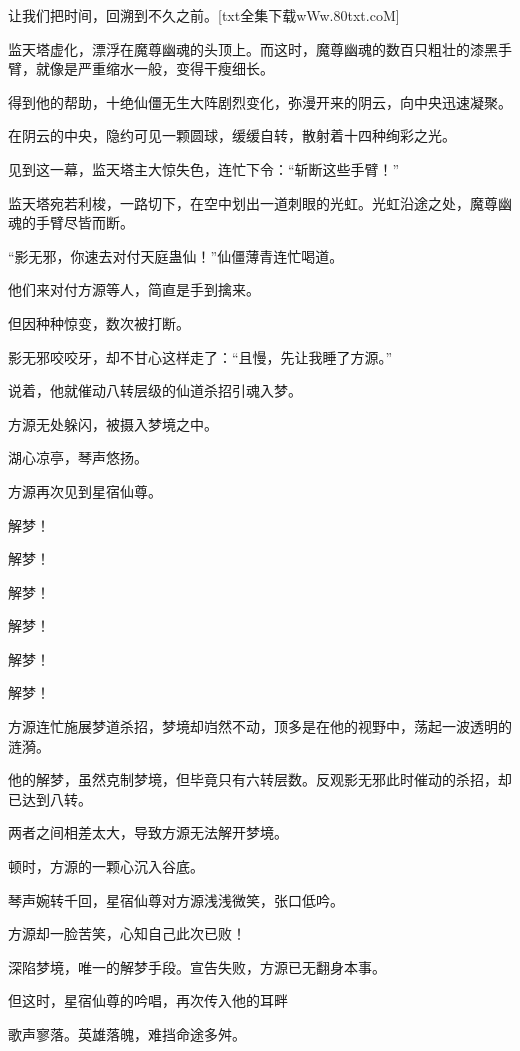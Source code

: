 
\begin{this_body}

让我们把时间，回溯到不久之前。[txt全集下载wWw.80txt.coM]

监天塔虚化，漂浮在魔尊幽魂的头顶上。而这时，魔尊幽魂的数百只粗壮的漆黑手臂，就像是严重缩水一般，变得干瘦细长。

得到他的帮助，十绝仙僵无生大阵剧烈变化，弥漫开来的阴云，向中央迅速凝聚。

在阴云的中央，隐约可见一颗圆球，缓缓自转，散射着十四种绚彩之光。

见到这一幕，监天塔主大惊失色，连忙下令：“斩断这些手臂！”

监天塔宛若利梭，一路切下，在空中划出一道刺眼的光虹。光虹沿途之处，魔尊幽魂的手臂尽皆而断。

“影无邪，你速去对付天庭蛊仙！”仙僵薄青连忙喝道。

他们来对付方源等人，简直是手到擒来。

但因种种惊变，数次被打断。

影无邪咬咬牙，却不甘心这样走了：“且慢，先让我睡了方源。”

说着，他就催动八转层级的仙道杀招引魂入梦。

方源无处躲闪，被摄入梦境之中。

湖心凉亭，琴声悠扬。

方源再次见到星宿仙尊。

解梦！

解梦！

解梦！

解梦！

解梦！

解梦！

方源连忙施展梦道杀招，梦境却岿然不动，顶多是在他的视野中，荡起一波透明的涟漪。

他的解梦，虽然克制梦境，但毕竟只有六转层数。反观影无邪此时催动的杀招，却已达到八转。

两者之间相差太大，导致方源无法解开梦境。

顿时，方源的一颗心沉入谷底。

琴声婉转千回，星宿仙尊对方源浅浅微笑，张口低吟。

方源却一脸苦笑，心知自己此次已败！

深陷梦境，唯一的解梦手段。宣告失败，方源已无翻身本事。

但这时，星宿仙尊的吟唱，再次传入他的耳畔

歌声寥落。英雄落魄，难挡命途多舛。


\end{this_body}
